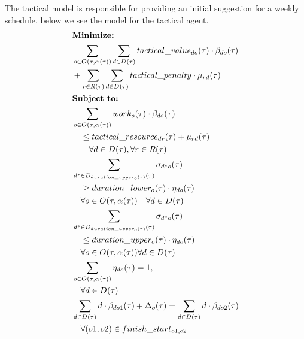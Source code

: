 The tactical model is responsible for providing an initial suggestion for a weekly schedule, below we see the model for the tactical agent.
\begin{alignat}{2}
	& \textbf{Minimize:} \notag\\
	& \sum_{o \in \SetOperation{}{\VarStrategicWorkOrderAssignment{}{}}} \sum_{d \in \SetDays{}} \ParTacticalValue \cdot \VarTacticalWork{d}{o}\notag\\  
	& + \sum_{r \in \SetResource} \sum_{d \in \SetDays{}} \ParTacticalPenalty \cdot \VarTacticalExcess                                               \\  
	& \textbf{Subject to:}                                                          \notag                                                                   \\
	& \sum_{o \in \SetOperation{}{\VarStrategicWorkOrderAssignment{}{}}} \ParOperationWork{o} \cdot \VarTacticalWork{d}{o}\notag\\
	& \quad \leq \ParTacticalResource + \VarTacticalExcess\notag\\ 
	& \quad \quad \forall  d \in \SetDays{}, \forall r \in \SetResource\\ 
	& \sum_{d^* \in \SetDays{\ParDurationUpper}} \VarTacticalWorkBinary{d^*}{o} \notag\\
	& \quad \geq \ParDurationLower \cdot \VarTacticalWorkBinaryConsecutive \notag\\ 
	& \quad \forall o \in \SetOperation{}{\VarStrategicWorkOrderAssignment{}{}} \quad \forall d \in \SetDays{} \\
	& \sum_{d^* \in  \SetDays{\ParDurationUpper}} \VarTacticalWorkBinary{d^*}{o} \notag\\
	& \quad \leq \ParDurationUpper \cdot \VarTacticalWorkBinaryConsecutive \notag\\ 
	& \quad \forall o \in \SetOperation{}{\VarStrategicWorkOrderAssignment{}{}} \forall d \in \SetDays{} \\
	& \sum_{o \in \SetOperation{}{\VarStrategicWorkOrderAssignment{}{}}} \VarTacticalWorkBinaryConsecutive = 1, \notag\\
	& \quad \forall d \in \SetDays{} \notag\\
	& \sum_{d \in \SetDays{}} d \cdot \VarTacticalWork{d}{o1} + \VarTacticalOperationDifference  = \sum_{d \in \SetDays{}} d \cdot \VarTacticalWork{d}{o2}                   \notag  \\ 
	& \quad \forall (o1, o2) \in \ParFinishStart                                                           \\ 

\end{alignat}
